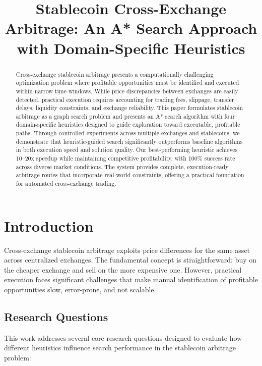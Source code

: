 \documentclass[11pt]{article}
\title{Stablecoin Cross-Exchange Arbitrage: An A* Search Approach with Domain-Specific Heuristics}
\author{}
\date{}
\begin{document}
\maketitle

\begin{abstract}
Cross-exchange stablecoin arbitrage presents a computationally challenging optimization problem where profitable opportunities must be identified and executed within narrow time windows. While price discrepancies between exchanges are easily detected, practical execution requires accounting for trading fees, slippage, transfer delays, liquidity constraints, and exchange reliability. This paper formulates stablecoin arbitrage as a graph search problem and presents an A* search algorithm with four domain-specific heuristics designed to guide exploration toward executable, profitable paths. Through controlled experiments across multiple exchanges and stablecoins, we demonstrate that heuristic-guided search significantly outperforms baseline algorithms in both execution speed and solution quality. Our best-performing heuristic achieves 10--20x speedup while maintaining competitive profitability, with 100\% success rate across diverse market conditions. The system provides complete, execution-ready arbitrage routes that incorporate real-world constraints, offering a practical foundation for automated cross-exchange trading.
\end{abstract}

\section{Introduction}

Cross-exchange stablecoin arbitrage exploits price differences for the same asset across centralized exchanges. The fundamental concept is straightforward: buy on the cheaper exchange and sell on the more expensive one. However, practical execution faces significant challenges that make manual identification of profitable opportunities slow, error-prone, and not scalable.

\subsection{Research Questions}

This work addresses several core research questions designed to evaluate how different heuristics influence search performance in the stablecoin arbitrage problem:
\end{document}
